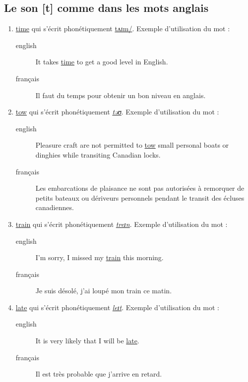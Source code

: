 \documentclass[12pt,a4paper]{book}
\begin{document}
\subsection{Le son [t] comme dans les mots anglais}
\label{sec:org461eecd}
\begin{enumerate}
\item \href{http://www.wordreference.com/enfr/time}{time} qui s'écrit phonétiquement \href{https://en.oxforddictionaries.com/definition/time}{tʌɪm/}. Exemple d'utilisation du mot :
\begin{description}
\item[{english}] \textenglish{It takes \href{https://youtu.be/A7pI96Osp9c}{time} to get a good level in English.}
\item[{français}] Il faut du temps pour obtenir un bon niveau en anglais.
\end{description}
\item \href{http://www.wordreference.com/enfr/tow}{tow} qui s'écrit phonétiquement \href{https://en.oxforddictionaries.com/definition/tow}{\emph{təʊ}}. Exemple d'utilisation du mot :
\begin{description}
\item[{english}] \textenglish{Pleasure craft are not permitted to \href{https://youtu.be/tGIx9uoJh9M}{tow} small personal
boats or dinghies while transiting Canadian locks.}
\item[{français}] Les embarcations de plaisance ne sont pas autorisées
à remorquer de petits bateaux ou dériveurs personnels pendant
le transit des écluses canadiennes.
\end{description}
\item \href{http://www.wordreference.com/enfr/train}{train} qui s'écrit phonétiquement \href{https://en.oxforddictionaries.com/definition/train}{\emph{treɪn}}. Exemple d'utilisation du mot :
\begin{description}
\item[{english}] \textenglish{I'm sorry, I missed my \href{https://youtu.be/jgxKrH-O2Kk}{train} this morning.}
\item[{français}] Je suis désolé, j'ai loupé mon train ce matin.
\end{description}
\item \href{http://www.wordreference.com/enfr/late}{late} qui s'écrit phonétiquement \href{https://en.oxforddictionaries.com/definition/late}{\emph{leɪt}}. Exemple d'utilisation du mot : 
\begin{description}
\item[{english}] \textenglish{It is very likely that I will be \href{https://youtu.be/v\_HNcDj7-Kw}{late}.}
\item[{français}] Il est très probable que j'arrive en retard.
\end{description}
\end{enumerate}
\end{document}
